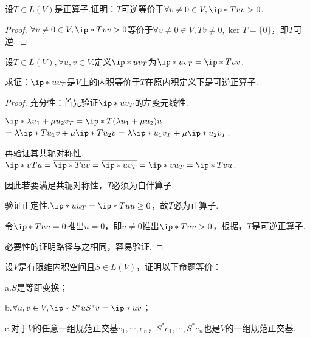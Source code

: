 \begin{problem}[7]\label{7.C.7}
    设\(T \in L(V)\)是正算子.证明：\(T\)可逆等价于\(\forall v \ne 0 \in V,\ip*{Tv}{v}>0\).
\end{problem}

\begin{proof}
    \(\forall v \ne 0 \in V,\ip*{Tv}{v}>0\)等价于\(\forall v \ne 0 \in V,Tv \ne 0,\ker T=\{0\}\)，即\(T\)可逆.
\end{proof}

\begin{problem}[8]\label{7.C.8}
    设\(T \in L(V),\forall u,v \in V\).定义\(\ip*{u}{v}_T\)为\(\ip*{u}{v}_T=\ip*{Tu}{v}\).

    求证：\(\ip*{u}{v}_T\)是\(V\)上的内积等价于\(T\)在原内积定义下是可逆正算子.
\end{problem}

\begin{proof}
    充分性：首先验证\(\ip*{u}{v}_T\)的左变元线性.

    \(\ip*{\lambda u_1+\mu u_2}{v}_T=\ip*{T(\lambda u_1+\mu u_2)}{u}\)
    \(=\lambda \ip*{Tu_1}{v}+\mu \ip*{Tu_2}{v}=\lambda \ip*{u_1}{v}_T+\mu \ip*{u_2}{v}_T\).
    
    再验证其共轭对称性.\(\ip*{v}{Tu}=\ol{\ip*{Tu}{v}}=\ol{\ip*{u}{v}_T}=\ip*{v}{u}_T=\ip*{Tv}{u}\).
    
    因此若要满足共轭对称性，\(T\)必须为自伴算子.
    
    验证正定性.\(\ip*{u}{u}_T=\ip*{Tu}{u} \geq 0\)，故\(T\)必为正算子.
    
    令\(\ip*{Tu}{u}=0\)推出\(u=0\)，即\(u \ne 0\)推出\(\ip*{Tu}{u}>0\)，根据，\(T\)是可逆正算子.
    
    必要性的证明路径与之相同，容易验证.
\end{proof}

\newpage

\begin{problem}[10]\label{7.C.10}
    设\(V\)是有限维内积空间且\(S \in L(V)\)，证明以下命题等价：

    a.\(S\)是等距变换；
    
    b.\(\forall u,v \in V,\ip*{S^*u}{S^*v}=\ip*{u}{v}\)；
    
    c.对于\(V\)的任意一组规范正交基\(e_1,\cdots,e_n\)，\(S^*e_1,\cdots,S^*e_n\)也是\(V\)的一组规范正交基.
\end{problem}


